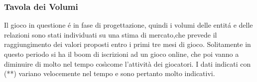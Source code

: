 

\subsubsection{Tavola dei Volumi}

Il gioco in questione \'{e} in fase di progettazione, quindi i volumi delle entit\'{a} e delle relazioni sono stati individuati su una stima di mercato,che prevede il raggiungimento dei valori proposti entro i primi tre mesi di gioco. Solitamente in questo periodo si ha il boom di iscrizioni ad un gioco online, che poi vanno a diminuire di molto nel tempo cos\`{\i}come l'attività dei giocatori. I dati indicati con (**) variano velocemente nel tempo e sono pertanto molto indicativi.

\noindent{}
